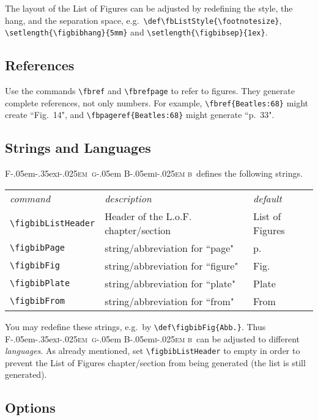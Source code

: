 \documentclass{ltxdoc}
\def\FigBib{{\rmfamily F\kern-.05em\lower-.35ex\hbox{\textsc{i\kern-.025em g}}\kern-.05em%
    B\kern-.05em\textsc{i\kern-.025em b}}}
\begin{document}
\DescribeMacro{\fbListStyle}
\DescribeMacro{\figbibhang}
\DescribeMacro{\figbibsep}
The layout of the List of Figures can be adjusted by redefining
the style, the hang, and the separation space, e.g.\
\verb+\def\fbListStyle{\footnotesize}+, \verb+\setlength{\figbibhang}{5mm}+ and
\verb+\setlength{\figbibsep}{1ex}+.

\subsection{References}

\DescribeMacro{\fbref}
\DescribeMacro{\fbpageref}
Use the commands \verb+\fbref+ and \verb+\fbrefpage+ to refer to
figures. They generate complete references, not only numbers. For
example, \verb+\fbref{Beatles:68}+ might create ``Fig.~14", and
\verb+\fbpageref{Beatles:68}+ might generate ``p.~33".

\subsection{Strings and Languages}\label{strings}

\DescribeMacro{\figbibListHeader}
\DescribeMacro{\figbibPage}
\DescribeMacro{\figbibFig}
\DescribeMacro{\figbibPlate}
\DescribeMacro{\figbibFrom}
\FigBib\ defines the following strings.

\begin{tabular}{l l l}
\emph{command} & \emph{description} & \emph{default}\\
\verb+\figbibListHeader+ & Header of the L.o.F. chapter/section & List of Figures\\
\verb+\figbibPage+ & string/abbreviation for ``page" & p.\\
\verb+\figbibFig+ & string/abbreviation for ``figure" & Fig.\\
\verb+\figbibPlate+ & string/abbreviation for ``plate" & Plate\\
\verb+\figbibFrom+ & string/abbreviation for ``from" & From\\
\end{tabular}

You may redefine these strings, e.g.\ by
\verb+\def\figbibFig{Abb.}+. Thus \FigBib\ can be adjusted to
different \emph{languages}. As already mentioned, set
\verb+\figbibListHeader+ to empty in order to prevent the List of Figures
chapter/section from being generated (the list is still
generated).

\subsection{Options}\label{options}
\end{document}
